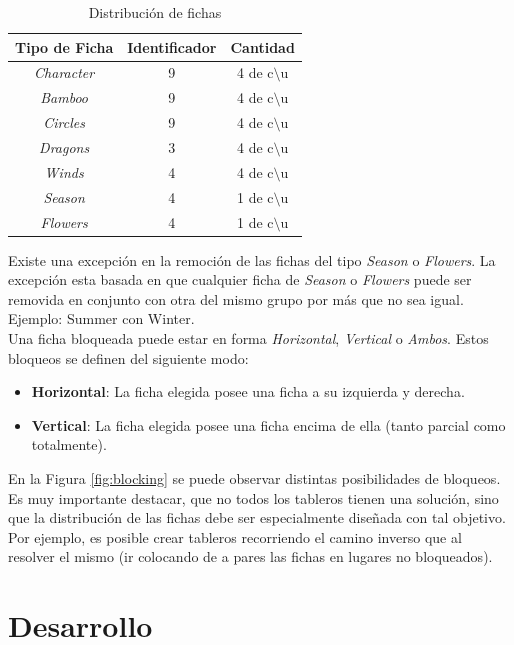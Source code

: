 \documentclass{sig-alternate}
\begin{document}
\begin{table}[h]
\begin{center}
	\begin{tabular}{|c|c|c|}
	\hline
	 Tipo de Ficha & Identificador & Cantidad\\
	\hline \hline
	\textit{Character} & 9 & 4 de c$\setminus$u \\
	\textit{Bamboo} & 9 & 4 de  c$\setminus$u  \\
	\textit{Circles} & 9 & 4 de  c$\setminus$u  \\
	\textit{Dragons} & 3 & 4 de  c$\setminus$u  \\	
	\textit{Winds} & 4 & 4 de  c$\setminus$u  \\
	\textit{Season} & 4 & 1 de c$\setminus$u \\
	\textit{Flowers} & 4 & 1 de  c$\setminus$u  \\
	\hline
	\end{tabular}
\end{center}
\caption{Distribuci\'on de fichas}
\label{tab:tiles}
\end{table}

	Existe una excepci\'on en la remoci\'on de las fichas del tipo \textit{Season} o \textit{Flowers}. La excepci\'on esta basada en que cualquier ficha de \textit{Season} o \textit{Flowers} puede ser removida en conjunto con otra del mismo grupo por más que no sea igual. Ejemplo: Summer con Winter. \\
	Una ficha bloqueada puede estar en forma \textit{Horizontal}, \textit{Vertical} o \textit{Ambos}. Estos bloqueos se definen del siguiente modo:
	\begin{itemize}
		\item \textbf{Horizontal}: La ficha elegida posee una ficha a su izquierda y derecha.
		\item \textbf{Vertical}: La ficha elegida posee una ficha encima de ella (tanto parcial como totalmente).		
	\end{itemize}
	En la Figura \ref{fig:blocking} se puede observar distintas posibilidades de bloqueos.\\
	Es muy importante destacar, que no todos los tableros tienen una soluci\'on, sino que la distribuci\'on de las fichas debe ser especialmente dise\~nada con tal objetivo. Por ejemplo, es posible crear tableros recorriendo el camino inverso que al resolver el mismo (ir colocando de a pares las fichas en lugares no bloqueados).
\section*{Desarrollo}
\end{document}

